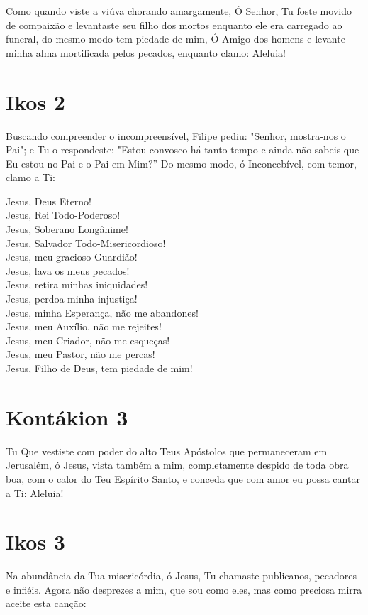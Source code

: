 \documentclass{subfiles}
\begin{document}
Como quando viste a viúva chorando amargamente, Ó Senhor, Tu
foste movido de compaixão e levantaste seu filho dos mortos enquanto ele era
carregado ao funeral, do mesmo modo tem piedade de mim, Ó Amigo dos
homens e levante minha alma mortificada pelos pecados, enquanto clamo:
Aleluia!

\section*{Ikos 2}

Buscando compreender o incompreensível, Filipe pediu:
"Senhor, mostra-nos o Pai"; e Tu o respondeste: "Estou convosco há tanto
tempo e ainda não sabeis que Eu estou no Pai e o Pai em Mim?” Do mesmo
modo, ó Inconcebível, com temor, clamo a Ti:

Jesus, Deus Eterno! \\
Jesus, Rei Todo-Poderoso! \\
Jesus, Soberano Longânime! \\
Jesus, Salvador Todo-Misericordioso! \\
Jesus, meu gracioso Guardião! \\
Jesus, lava os meus pecados! \\
Jesus, retira minhas iniquidades! \\
Jesus, perdoa minha injustiça! \\
Jesus, minha Esperança, não me abandones! \\
Jesus, meu Auxílio, não me rejeites! \\
Jesus, meu Criador, não me esqueças! \\
Jesus, meu Pastor, não me percas! \\
Jesus, Filho de Deus, tem piedade de mim!

\section*{Kontákion 3}

Tu Que vestiste com poder do alto Teus Apóstolos que permaneceram
em Jerusalém, ó Jesus, vista também a mim, completamente despido de toda
obra boa, com o calor do Teu Espírito Santo, e conceda que com amor eu possa
cantar a Ti: Aleluia!

\section*{Ikos 3}

Na abundância da Tua misericórdia, ó Jesus, Tu chamaste publicanos,
pecadores e infiéis. Agora não desprezes a mim, que sou como eles, mas como
preciosa mirra aceite esta canção:
\end{document}
